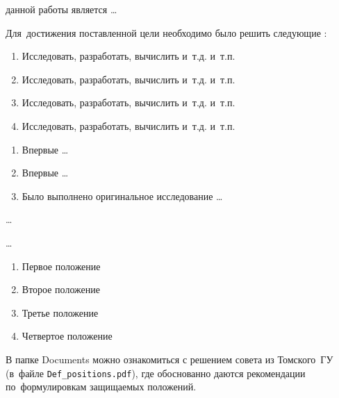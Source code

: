 

{\aim} данной работы является \ldots

Для~достижения поставленной цели необходимо было решить следующие {\tasks}:
\begin{enumerate}[beginpenalty=10000] %
  \item Исследовать, разработать, вычислить и~т.\:д. и~т.\:п.
  \item Исследовать, разработать, вычислить и~т.\:д. и~т.\:п.
  \item Исследовать, разработать, вычислить и~т.\:д. и~т.\:п.
  \item Исследовать, разработать, вычислить и~т.\:д. и~т.\:п.
\end{enumerate}


{\novelty}
\begin{enumerate}[beginpenalty=10000] %
  \item Впервые \ldots
  \item Впервые \ldots
  \item Было выполнено оригинальное исследование \ldots
\end{enumerate}

{\influence} \ldots

{\methods} \ldots

{}
\begin{enumerate}[beginpenalty=10000] %
  \item Первое положение
  \item Второе положение
  \item Третье положение
  \item Четвертое положение
\end{enumerate}
В папке Documents можно ознакомиться с решением совета из Томского~ГУ
(в~файле \verb+Def_positions.pdf+), где обоснованно даются рекомендации
по~формулировкам защищаемых положений.

